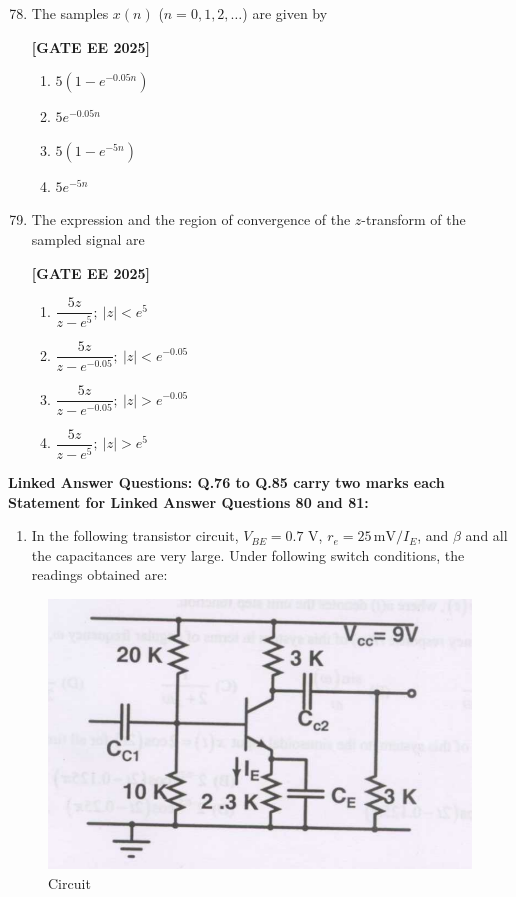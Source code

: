 \documentclass[12pt]{article}
\begin{document}
\begin{enumerate}[leftmargin=*, label=\textbf{Q.\arabic*:}]
\setcounter{enumi}{77}

\item The samples $x(n)$ ($n=0,1,2,\ldots$) are given by
 
\noindent \textbf{[GATE EE 2025]}
\begin{enumerate}
  \item $5 \left( 1 - e^{-0.05 n} \right)$
  \item $5 e^{-0.05 n}$
  \item $5 \left( 1 - e^{-5 n} \right)$
  \item $5 e^{-5 n}$
\end{enumerate}

\item The expression and the region of convergence of the $z$-transform of the sampled signal are
 
\noindent \textbf{[GATE EE 2025]}
\begin{enumerate}
  \item $\dfrac{5z}{z-e^{5}};~ |z|<e^{5}$
  \item $\dfrac{5z}{z-e^{-0.05}};~ |z|<e^{-0.05}$
  \item $\dfrac{5z}{z-e^{-0.05}};~ |z|>e^{-0.05}$
  \item $\dfrac{5z}{z-e^{5}};~ |z|>e^{5}$
\end{enumerate}

\end{enumerate}


 \large \textbf {Linked Answer Questions: Q.76 to Q.85 carry two marks each}
 \large \textbf {Statement for Linked Answer Questions 80 and 81: }

\begin{enumerate}
\item In the following transistor circuit, $V_{BE}=0.7$ V, $r_e = 25\,\text{mV}/I_E$, and $\beta$ and all the capacitances are very large. Under following switch conditions, the readings obtained are:
\end{enumerate}
\begin{figure}[H]\centering
\includegraphics[width=0.6\columnwidth]{figs/q8081.png}
\caption{Circuit}
\label{fig:q8081}
\end{figure}
\end{document}

